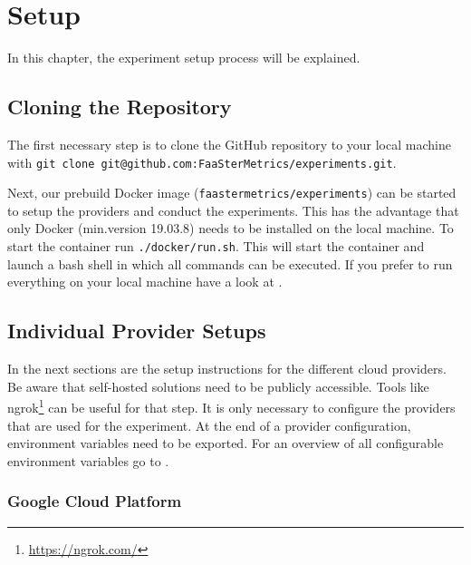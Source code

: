 \documentclass[../main.tex]{subfiles}
\begin{document}
\section{Setup}\label{sec:setup}
In this chapter, the experiment setup process will be explained.

\subsection{Cloning the Repository}\label{sec:clonesetup}

The first necessary step is to clone the GitHub repository to your local machine with 
\texttt{git clone git@github.com:FaaSterMetrics/experiments.git}. 

Next, our prebuild Docker image (\texttt{faastermetrics/experiments}) can be started to setup the providers and conduct the experiments. 
This has the advantage that only Docker (min.\@ version 19.03.8) needs to be installed on the local machine. 
To start the container run \texttt{./docker/run.sh}. 
This will start the container and launch a bash shell in which all commands can be executed.
If you prefer to run everything on your local machine have a look at .

\subsection{Individual Provider Setups}\label{sec:providersetup}

In the next sections are the setup instructions for the different cloud providers. 
Be aware that self-hosted solutions need to be publicly accessible. 
Tools like ngrok\footnote{\url{https://ngrok.com/}} can be useful for that step.
It is only necessary to configure the providers that are used for the experiment.
At the end of a provider configuration, environment variables need to be exported.
For an overview of all configurable environment variables go to .


\subsubsection{Google Cloud Platform}\label{sec:providersetupgcp}
\end{document}
